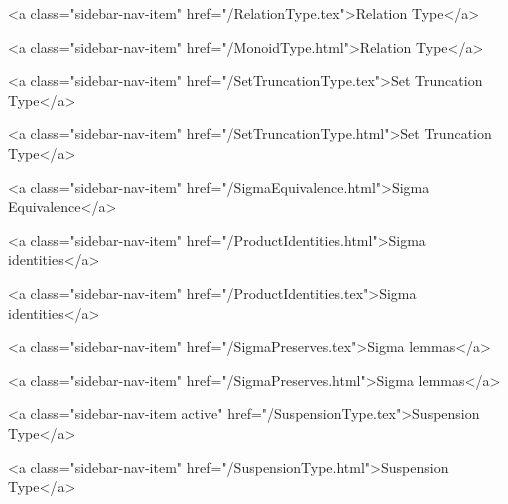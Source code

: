       
    
      
        
          <a class="sidebar-nav-item" href="/RelationType.tex">Relation Type</a>
        
      
    
      
        
          <a class="sidebar-nav-item" href="/MonoidType.html">Relation Type</a>
        
      
    
      
        
          <a class="sidebar-nav-item" href="/SetTruncationType.tex">Set Truncation Type</a>
        
      
    
      
        
          <a class="sidebar-nav-item" href="/SetTruncationType.html">Set Truncation Type</a>
        
      
    
      
        
          <a class="sidebar-nav-item" href="/SigmaEquivalence.html">Sigma Equivalence</a>
        
      
    
      
        
          <a class="sidebar-nav-item" href="/ProductIdentities.html">Sigma identities</a>
        
      
    
      
        
          <a class="sidebar-nav-item" href="/ProductIdentities.tex">Sigma identities</a>
        
      
    
      
        
          <a class="sidebar-nav-item" href="/SigmaPreserves.tex">Sigma lemmas</a>
        
      
    
      
        
          <a class="sidebar-nav-item" href="/SigmaPreserves.html">Sigma lemmas</a>
        
      
    
      
        
          <a class="sidebar-nav-item active" href="/SuspensionType.tex">Suspension Type</a>
        
      
    
      
        
          <a class="sidebar-nav-item" href="/SuspensionType.html">Suspension Type</a>
        
